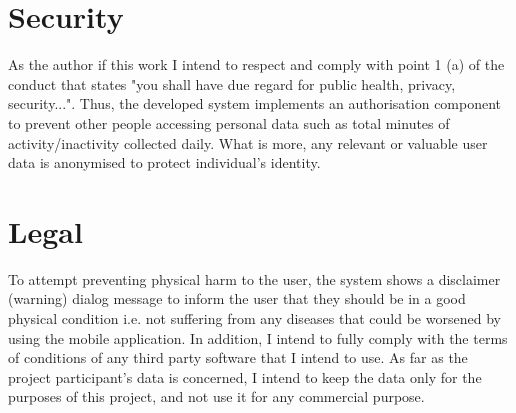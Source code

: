     \section{Security}
    As the author if this work I intend to respect and comply with point 1 (a) of the conduct that states "you shall have due regard for public health, privacy, security...". Thus, the developed system implements an authorisation component to prevent other people accessing personal data such as total minutes of activity/inactivity collected daily. What is more, any relevant or valuable user data is anonymised to protect individual’s identity.

    
    \section{Legal}
    To attempt preventing physical harm to the user, the system shows a disclaimer (warning) dialog message to inform the user that they should be in a good physical condition i.e. not suffering from any diseases that could be worsened by using the mobile application. In addition, I intend to fully comply with the terms of conditions of any third party software that I intend to use. As far as the project participant’s data is concerned, I intend to keep the data only for the purposes of this project, and not use it for any commercial purpose.